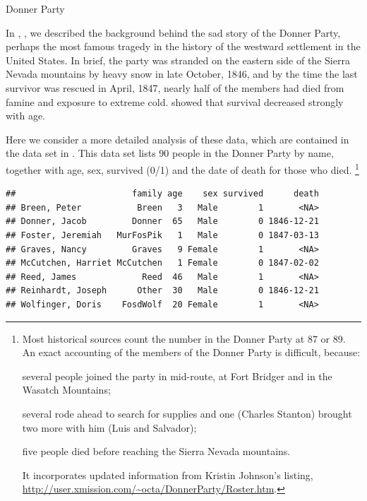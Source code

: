 \documentclass[11pt]{book}
\renewenvironment{knitrout}{\small\renewcommand{\baselinestretch}{.85}}{} %
\begin{document}
\begin{Example}[donner1]{Donner Party}

In , , we described the background behind the
sad story of the Donner Party, perhaps
the most famous tragedy in the history of the westward settlement in the United States. In brief, the party was stranded on the eastern side of the
Sierra Nevada mountains by heavy snow in late October, 1846, and by
the time the last survivor was rescued in April, 1847, nearly half
of the members had died from famine and exposure to extreme cold.
 showed that survival decreased strongly with age.

Here we consider a more detailed analysis of these data, which are contained in the
data set  in .  This data set lists 90 people in
the Donner Party by name, together with age, sex, survived (0/1) and the date of
death for those who died.%
\footnote{
Most historical sources count the number in the Donner Party at 87 or 89.
An exact accounting of the members of the Donner Party is difficult, because:
\begin{seriate}
 \item several people joined the party in mid-route, at Fort Bridger and in the
Wasatch Mountains; 
 \item several rode ahead to search for supplies and one (Charles Stanton)
 brought two more with him (Luis and Salvador);
 \item five people died before reaching the Sierra Nevada mountains.
\end{seriate}
It incorporates updated information from Kristin Johnson's
listing, \url{http://user.xmission.com/~octa/DonnerParty/Roster.htm}.
}

\begin{knitrout}
\color{fgcolor}\begin{kframe}
\begin{alltt}
\hlstd{(}\hlstd{,} \hlstd{=}\hlstd{)}   
                         
 \hlstd{)}
\end{alltt}
\begin{verbatim}
##                       family age    sex survived      death
## Breen, Peter           Breen   3   Male        1       <NA>
## Donner, Jacob         Donner  65   Male        0 1846-12-21
## Foster, Jeremiah   MurFosPik   1   Male        0 1847-03-13
## Graves, Nancy         Graves   9 Female        1       <NA>
## McCutchen, Harriet McCutchen   1 Female        0 1847-02-02
## Reed, James             Reed  46   Male        1       <NA>
## Reinhardt, Joseph      Other  30   Male        0 1846-12-21
## Wolfinger, Doris    FosdWolf  20 Female        1       <NA>
\end{verbatim}
\end{kframe}
\end{knitrout}


\end{Example}
\end{document}
